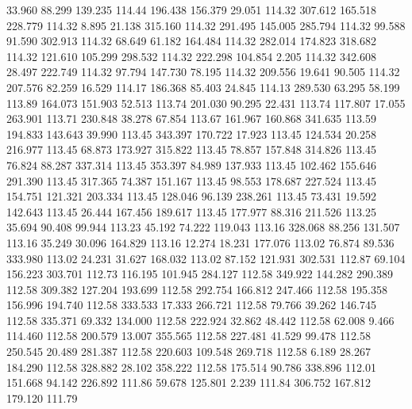   33.960   88.299  139.235       114.44
 196.438  156.379   29.051       114.32
 307.612  165.518  228.779       114.32
   8.895   21.138  315.160       114.32
 291.495  145.005  285.794       114.32
  99.588   91.590  302.913       114.32
  68.649   61.182  164.484       114.32
 282.014  174.823  318.682       114.32
 121.610  105.299  298.532       114.32
 222.298  104.854    2.205       114.32
 342.608   28.497  222.749       114.32
  97.794  147.730   78.195       114.32
 209.556   19.641   90.505       114.32
 207.576   82.259   16.529       114.17
 186.368   85.403   24.845       114.13
 289.530   63.295   58.199       113.89
 164.073  151.903   52.513       113.74
 201.030   90.295   22.431       113.74
 117.807   17.055  263.901       113.71
 230.848   38.278   67.854       113.67
 161.967  160.868  341.635       113.59
 194.833  143.643   39.990       113.45
 343.397  170.722   17.923       113.45
 124.534   20.258  216.977       113.45
  68.873  173.927  315.822       113.45
  78.857  157.848  314.826       113.45
  76.824   88.287  337.314       113.45
 353.397   84.989  137.933       113.45
 102.462  155.646  291.390       113.45
 317.365   74.387  151.167       113.45
  98.553  178.687  227.524       113.45
 154.751  121.321  203.334       113.45
 128.046   96.139  238.261       113.45
  73.431   19.592  142.643       113.45
  26.444  167.456  189.617       113.45
 177.977   88.316  211.526       113.25
  35.694   90.408   99.944       113.23
  45.192   74.222  119.043       113.16
 328.068   88.256  131.507       113.16
  35.249   30.096  164.829       113.16
  12.274   18.231  177.076       113.02
  76.874   89.536  333.980       113.02
  24.231   31.627  168.032       113.02
  87.152  121.931  302.531       112.87
  69.104  156.223  303.701       112.73
 116.195  101.945  284.127       112.58
 349.922  144.282  290.389       112.58
 309.382  127.204  193.699       112.58
 292.754  166.812  247.466       112.58
 195.358  156.996  194.740       112.58
 333.533   17.333  266.721       112.58
  79.766   39.262  146.745       112.58
 335.371   69.332  134.000       112.58
 222.924   32.862   48.442       112.58
  62.008    9.466  114.460       112.58
 200.579   13.007  355.565       112.58
 227.481   41.529   99.478       112.58
 250.545   20.489  281.387       112.58
 220.603  109.548  269.718       112.58
   6.189   28.267  184.290       112.58
 328.882   28.102  358.222       112.58
 175.514   90.786  338.896       112.01
 151.668   94.142  226.892       111.86
  59.678  125.801    2.239       111.84
 306.752  167.812  179.120       111.79
